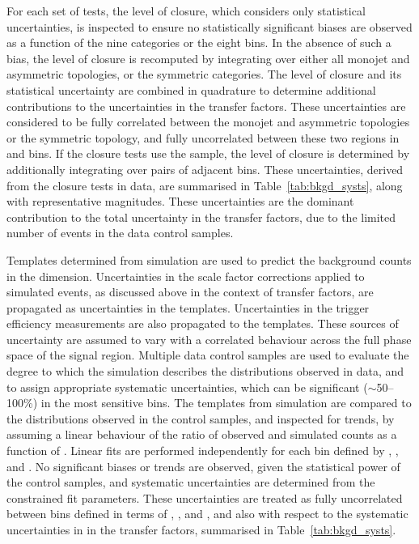 For each set of tests, the level of closure, which considers only
statistical uncertainties, is inspected to ensure no statistically
significant biases are observed as a function of the nine \njet
categories or the eight \scalht bins. In the absence of such a bias,
the level of closure is recomputed by integrating over either all
monojet and asymmetric topologies, or the symmetric \njet
categories. The level of closure and its statistical uncertainty are
combined in quadrature to determine additional contributions to the
uncertainties in the transfer factors. These uncertainties are
considered to be fully correlated between the monojet and asymmetric
topologies or the symmetric topology, and fully uncorrelated between
these two regions in \njet and \scalht bins. If the closure tests use
the \mmj sample, the level of closure is determined by additionally
integrating over pairs of adjacent \scalht bins. These uncertainties,
derived from the closure tests in data, are summarised in
Table~\ref{tab:bkgd_systs}, along with representative
magnitudes. These uncertainties are the dominant contribution to the
total uncertainty in the transfer factors, due to the limited number
of events in the data control samples.

Templates determined from simulation are used to predict the
background counts in the \mht dimension. Uncertainties in the scale
factor corrections applied to simulated events, as discussed above in
the context of transfer factors, are propagated as uncertainties in
the \HTmiss templates. Uncertainties in the trigger efficiency
measurements are also propagated to the \HTmiss templates. These
sources of uncertainty are assumed to vary with a correlated behaviour
across the full phase space of the signal region. Multiple data
control samples are used to evaluate the degree to which the
simulation describes the \mht distributions observed in data, and to
assign appropriate systematic uncertainties, which can be significant
($\sim$50--100\%) in the most sensitive \mht bins.  The \mht templates
from simulation are compared to the distributions observed in the
control samples, and inspected for trends, by assuming a linear
behaviour of the ratio of observed and simulated counts as a function
of \HTmiss. Linear fits are performed independently for each bin
defined by \njet, \nb, and \scalht. No significant biases or trends
are observed, given the statistical power of the control samples, and
systematic uncertainties are determined from the constrained fit
parameters. These uncertainties are treated as fully uncorrelated
between bins defined in terms of \njet, \nb, and \scalht, and also
with respect to the systematic uncertainties in in the transfer
factors, summarised in Table~\ref{tab:bkgd_systs}.


